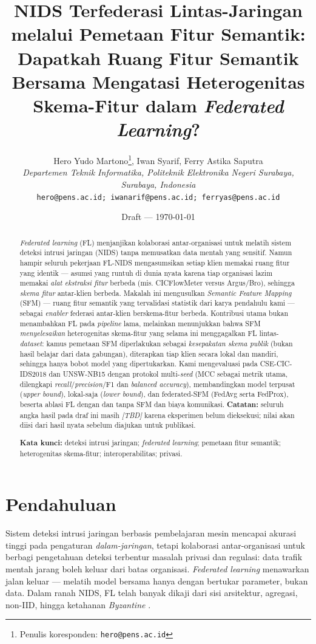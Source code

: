 \documentclass[11pt,a4paper]{article}
\title{\textbf{NIDS Terfederasi Lintas-Jaringan melalui Pemetaan Fitur Semantik:
Dapatkah Ruang Fitur Semantik Bersama Mengatasi Heterogenitas Skema-Fitur dalam
\emph{Federated Learning}?}}
\author{Hero Yudo Martono\thanks{Penulis koresponden: \texttt{hero@pens.ac.id}},
\quad Iwan Syarif, \quad Ferry Astika Saputra \\[0.3em]
\textit{Departemen Teknik Informatika, Politeknik Elektronika Negeri Surabaya,
Surabaya, Indonesia} \\
\texttt{hero@pens.ac.id; iwanarif@pens.ac.id; ferryas@pens.ac.id}}
\date{Draft --- \today}
\newcommand{\TBD}{\textit{[TBD]}}
\begin{document}
\maketitle

\begin{abstract}
\emph{Federated learning} (FL) menjanjikan kolaborasi antar-organisasi untuk
melatih sistem deteksi intrusi jaringan (NIDS) tanpa memusatkan data mentah yang
sensitif. Namun hampir seluruh pekerjaan FL-NIDS mengasumsikan setiap klien
memakai ruang fitur yang identik --- asumsi yang runtuh di dunia nyata karena
tiap organisasi lazim memakai \emph{alat ekstraksi fitur} berbeda (mis.
CICFlowMeter versus Argus/Bro), sehingga \emph{skema fitur} antar-klien berbeda.
Makalah ini mengusulkan \emph{Semantic Feature Mapping} (SFM) --- ruang fitur
semantik yang tervalidasi statistik dari karya pendahulu kami \cite{sfm} ---
sebagai \emph{enabler} federasi antar-klien berskema-fitur berbeda. Kontribusi
utama bukan menambahkan FL pada \emph{pipeline} lama, melainkan menunjukkan bahwa
SFM \emph{menyelesaikan} heterogenitas skema-fitur yang selama ini menggagalkan FL
lintas-\emph{dataset}: kamus pemetaan SFM diperlakukan sebagai \emph{kesepakatan
skema publik} (bukan hasil belajar dari data gabungan), diterapkan tiap klien
secara lokal dan mandiri, sehingga hanya bobot model yang dipertukarkan. Kami
mengevaluasi pada CSE-CIC-IDS2018 dan UNSW-NB15 dengan protokol multi-\emph{seed}
(MCC sebagai metrik utama, dilengkapi \emph{recall}/\emph{precision}/F1 dan
\emph{balanced accuracy}), membandingkan model terpusat (\emph{upper bound}),
lokal-saja (\emph{lower bound}), dan federated-SFM (FedAvg serta FedProx), beserta
ablasi FL dengan dan tanpa SFM dan biaya komunikasi. \textbf{Catatan:} seluruh
angka hasil pada draf ini masih \TBD{} karena eksperimen belum dieksekusi; nilai
akan diisi dari hasil nyata sebelum diajukan untuk publikasi.

\medskip
\noindent\textbf{Kata kunci:} deteksi intrusi jaringan; \emph{federated learning};
pemetaan fitur semantik; heterogenitas skema-fitur; interoperabilitas; privasi.
\end{abstract}

\section{Pendahuluan}
\label{sec:intro}

Sistem deteksi intrusi jaringan berbasis pembelajaran mesin mencapai akurasi
tinggi pada pengaturan \emph{dalam-jaringan}, tetapi kolaborasi antar-organisasi
untuk berbagi pengetahuan deteksi terbentur masalah privasi dan regulasi: data
trafik mentah jarang boleh keluar dari batas organisasi. \emph{Federated
learning} \cite{popoola} menawarkan jalan keluar --- melatih model bersama hanya
dengan bertukar parameter, bukan data. Dalam ranah NIDS, FL telah banyak dikaji
dari sisi arsitektur, agregasi, non-IID, hingga ketahanan \emph{Byzantine}
\cite{fsurvey1,fsurvey2,ftaxonomy}.
\end{document}
